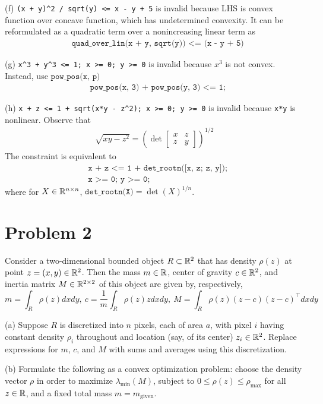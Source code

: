 \documentclass[11pt]{article}
\newcommand{\T}{^\top}
\begin{document}
(f) \verb|(x + y)^2 / sqrt(y) <= x - y + 5| is invalid because LHS is convex function over concave function, which has undetermined convexity. It can be reformulated as a quadratic term over a nonincreasing linear term as
\begin{align*}
    &\texttt{quad\_over\_lin(x + y, sqrt(y)) <= (x - y + 5)} 
\end{align*}

(g) \verb|x^3 + y^3 <= 1; x >= 0; y >= 0| is invalid because $x^3$ is not convex. Instead, use $\texttt{pow\_pos(x, p)}$
\begin{align*}
    &\texttt{pow\_pos(x, 3) + pow\_pos(y, 3) <= 1;}
\end{align*}

(h) \verb|x + z <= 1 + sqrt(x*y - z^2); x >= 0; y >= 0| is invalid because \texttt{x*y} is nonlinear. Observe that 
\begin{align*}
    \sqrt{xy - z^2} = \left( \det 
    \begin{bmatrix}
        x & z \\
        z & y
    \end{bmatrix} \right) ^{1/2}
\end{align*}
The constraint is equivalent to 
\begin{align*}
    &\texttt{x + z <= 1 + det\_rootn([x, z; z, y]);} \\
    &\texttt{x >= 0; y >= 0;}
\end{align*}
where for $X\in {{\mathbb{R}}}^{n \times n}$, $\texttt{det\_rootn(X)} = \det(X)^{1/n}$.



\clearpage
\section*{Problem 2}
Consider a two-dimensional bounded object $R \subset {{\mathbb{R}}}^2$ that has density $\rho (z)$ at point $z = (x, y) \in {{\mathbb{R}}}^2$. Then the mass $m \in {{\mathbb{R}}}$, center of gravity $c \in {{\mathbb{R}}}^2$, and inertia matrix $M \in{{\mathbb{R}}}^{2\times 2}$ of this object are given by, respectively,
\[
m = \int_{R} \rho (z) dxdy,\ c=\frac{1}{m} \int_R \rho (z) z dxdy,\ M = \int_R \rho (z) (z - c)(z-c)\T dxdy
\]

(a) Suppose $R$ is discretized into $n$ pixels, each of area $a$, with pixel $i$ having constant density $\rho_i$ throughout and location (say, of its center) $z_i \in{{\mathbb{R}}}^2$. Replace expressions for $m$, $c$, and $M$ with sums and averages using this discretization.

(b) Formulate the following as a convex optimization problem: choose the density vector $\rho$ in order to maximize $\lambda_{\min}(M)$, subject to $0 \leq \rho(z) \leq \rho_{\max}$ for all $z \in{{\mathbb{R}}}$, and a fixed total mass $m = m_{\text{given}}$.
\end{document}
